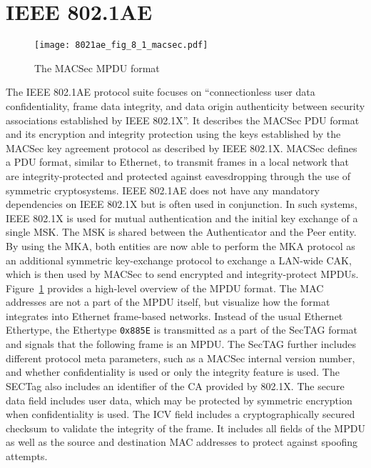 \section{IEEE 802.1AE}
\begin{figure}[ht]
    \centering
    \texttt{[image: 8021ae\_fig\_8\_1\_macsec.pdf]}
    \caption{The MACSec MPDU format\cite{IEEE8021X}}\label{fig:8021ae_fig_8_1_macsec.pdf}
\end{figure} 
The IEEE 802.1AE protocol suite focuses on ``connectionless user data confidentiality, frame data integrity, and data origin authenticity between security associations established by IEEE 802.1X''\cite{IEEE8021AE}. It describes the MACSec \ac{PDU} format and its encryption and integrity protection using the keys established by the MACSec key agreement protocol as described by IEEE 802.1X. MACSec defines a \ac{PDU} format, similar to Ethernet, to transmit frames in a local network that are integrity-protected and protected against eavesdropping through the use of symmetric cryptosystems. IEEE 802.1AE does not have any mandatory dependencies on IEEE 802.1X but is often used in conjunction. In such systems, IEEE 802.1X is used for mutual authentication and the initial key exchange of a single \ac{MSK}. The \ac{MSK} is shared between the Authenticator and the Peer entity. By using the MKA, both entities are now able to perform the \ac{MKA} protocol as an additional symmetric key-exchange protocol to exchange a \ac{LAN}-wide CAK, which is then used by MACSec to send encrypted and integrity-protect \acp{MPDU}. Figure~\ref{fig:8021ae_fig_8_1_macsec.pdf} provides a high-level overview of the \ac{MPDU} format. The MAC addresses are not a part of the \ac{MPDU} itself, but visualize how the format integrates into Ethernet frame-based networks. Instead of the usual Ethernet Ethertype, the Ethertype \texttt{0x885E} is transmitted as a part of the SecTAG format and signals that the following frame  is an \ac{MPDU}. The SecTAG further includes different protocol meta parameters, such as a MACSec internal version number, and whether confidentiality is used or only the integrity feature is used. The SECTag also includes an identifier of the \ac{CA} provided by 802.1X. The secure data field includes user data, which may be protected by symmetric encryption when confidentiality is used. The ICV field includes a cryptographically secured checksum to validate the integrity of the frame. It includes all fields of the \ac{MPDU} as well as the source and destination MAC addresses to protect against spoofing attempts. 


